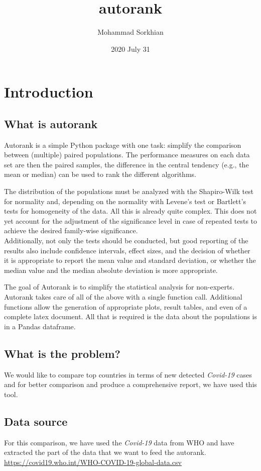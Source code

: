 \documentclass[12pt, letterpaper, twoside]{report}
\title{\textbf{autorank}}
\author{Mohammad Sorkhian}
\date{2020 July 31}
\begin{document}
\maketitle

\chapter{Introduction}
\section{What is \textbf{autorank}}
Autorank is a simple Python package with one task: 
simplify the comparison between (multiple) paired populations. 
The performance measures on each data set are then the paired samples, 
the difference in the central tendency (e.g., the mean or median) 
can be used to rank the different algorithms.

The distribution of the populations must be analyzed with the Shapiro-Wilk test for normality and, 
depending on the normality with Levene's test or Bartlett's tests for homogeneity of the data. 
All this is already quite complex. This does not yet account for the adjustment of the 
significance level in case of repeated tests to achieve the desired family-wise significance. 
\\Additionally, not only the tests should be conducted, but good reporting of the results also 
include confidence intervals, effect sizes, and the decision of whether it is appropriate to 
report the mean value and standard deviation, or whether the median value and 
the median absolute deviation is more appropriate.

The goal of Autorank is to simplify the statistical analysis for non-experts. 
Autorank takes care of all of the above with a single function call. 
Additional functions allow the generation of appropriate plots, result tables, 
and even of a complete latex document. All that is required is the data about 
the populations is in a Pandas dataframe.

\section{What is the problem?}
We would like to compare top countries in terms of new detected \textit{Covid-19} cases and 
for better comparison and produce a comprehensive report, we have used this tool.  

\section{Data source}
For this comparison, we have used the \textit{Covid-19} data from WHO and 
have extracted the part of the data that we want to feed the autorank.
\\ \url{https://covid19.who.int/WHO-COVID-19-global-data.csv}
\end{document}
